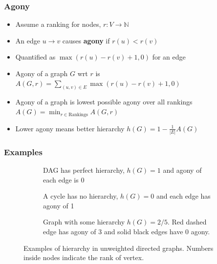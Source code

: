 \documentclass{beamer}
\begin{document}
\begin{frame}
    \frametitle{Agony}
    \begin{itemize}
        \item Assume a ranking for nodes, $r:V\rightarrow \mathbb{N}$
        \item An edge $u \rightarrow v$ causes \textbf{agony} if $r(u)<r(v)$
        \item Quantified as $\max(r(u)-r(v)+1,0)$ for an edge
        \item Agony of a graph $G$ wrt $r$ is $A(G,r) =  \sum_{(u,v)\in E} \max(r(u)-r(v)+1,0)$
        \item Agony of a graph is lowest possible agony over all rankings $A(G) = \min_{r\in \text{Rankings}}A(G,r)$
        \item Lower agony means better hierarchy $h(G)=1-\frac{1}{|E|}A(G)$
    \end{itemize}
\end{frame}

\begin{frame}
    \frametitle{Examples}
    \begin{figure}[!ht]
        \centering
        \begin{subfigure}[t]{0.5\textwidth}
            \centering
            \scalebox{0.5}{}
            \caption{DAG has perfect hierarchy, $h(G)=1$ and agony of each edge is 0}
            \label{fig:dag}
        \end{subfigure}

        \begin{subfigure}[t]{0.4\textwidth}
            \centering
            \scalebox{0.5}{}
            \caption{A cycle has no hierarchy, $h(G)=0$ and each edge has agony of 1}
            \label{fig:cycle}
        \end{subfigure}
        \hspace{4mm}%
        \begin{subfigure}[t]{0.4\textwidth}
            \centering
            \scalebox{0.5}{}
            \caption{Graph with some hierarchy $h(G)=2/5$. Red dashed edge has agony of 3 and solid black edges have 0 agony.  }
            \label{fig:some-hierarchy}
        \end{subfigure}
        \caption{Examples of hierarchy in unweighted directed graphs. Numbers inside nodes indicate the rank of vertex.}
        \label{fig:hierarchy} 
    \end{figure}
\end{frame}
\end{document}
